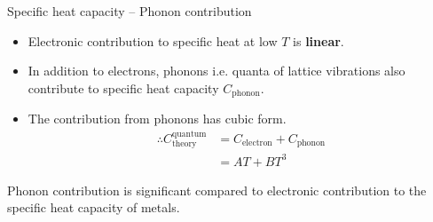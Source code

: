 %
\begin{frame}{Specific heat capacity -- Phonon contribution}
	\begin{itemize}
		\item Electronic contribution to specific heat at low $T$ is \textbf{linear}.
		\item In addition to electrons, phonons i.e. quanta of lattice vibrations also contribute to specific heat capacity \(C_\text{phonon}\).
		\item The contribution from phonons has cubic form.
		\begin{align*}
			\therefore C_\text{theory}^\text{quantum} &= C_\text{electron} + C_\text{phonon} \\
			&= AT + BT^3
		\end{align*}
	\end{itemize}
	\begin{keyinsight}
		Phonon contribution is significant compared to electronic contribution to the specific heat capacity of metals.
	\end{keyinsight}
\end{frame}
%